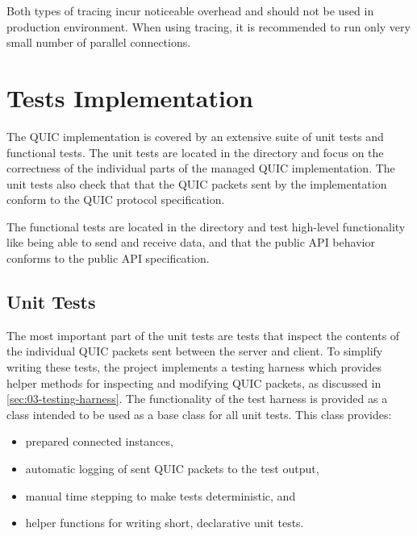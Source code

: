 Both types of tracing incur noticeable overhead and should not be used in production environment.
When using tracing, it is recommended to run only very small number of parallel connections.

\section{Tests Implementation}

The QUIC implementation is covered by an extensive suite of unit tests and functional tests. The
unit tests are located in the  directory and focus on the
correctness of the individual parts of the managed QUIC implementation. The unit tests also check
that that the QUIC packets sent by the implementation conform to the QUIC protocol specification.

The functional tests are located in the
\allowbreak{} directory and test
high-level functionality like being able to send and receive data, and that the public API behavior
conforms to the public API specification.

\subsection{Unit Tests}

The most important part of the unit tests are tests that inspect the contents of the individual QUIC
packets sent between the server and client. To simplify writing these tests, the
 project implements a testing harness which provides helper
methods for inspecting and modifying QUIC packets, as discussed in \autoref{sec:03-testing-harness}.
The functionality of the test harness is provided as a \ManualTransmissionQuicTestBase{} class
intended to be used as a base class for all unit tests. This class provides:

\begin{itemize}

  \item prepared connected \ManagedQuicConnection{} instances,

  \item automatic logging of sent QUIC packets to the test output,

  \item manual time stepping to make tests deterministic, and

  \item helper functions for writing short, declarative unit tests.

\end{itemize}

